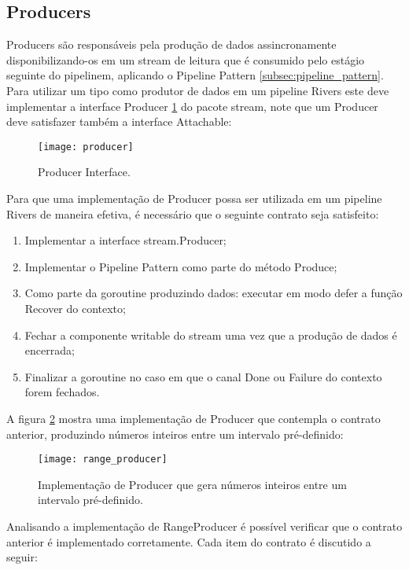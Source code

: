 \subsection{Producers}
\label{sec:rivers:producers}

Producers são responsáveis pela produção de dados assincronamente disponibilizando-os em um stream de leitura que é consumido pelo estágio seguinte do pipelinem, aplicando o Pipeline Pattern \ref{subsec:pipeline_pattern}. Para utilizar um tipo como produtor de dados em um pipeline Rivers este deve implementar a interface Producer \ref{code:rivers:producer} do pacote stream, note que um Producer deve satisfazer também a interface Attachable:

\begin{figure}[H]
  \texttt{[image: producer]}
  \centering
  \caption{Producer Interface.}
  \label{code:rivers:producer}
\end{figure}

Para que uma implementação de Producer possa ser utilizada em um pipeline Rivers de maneira efetiva, é necessário que o seguinte contrato seja satisfeito:

\begin{enumerate}
  \item Implementar a interface stream.Producer;
  \item Implementar o Pipeline Pattern como parte do método Produce;
  \item Como parte da goroutine produzindo dados: executar em modo defer a função Recover do contexto;
  \item Fechar a componente writable do stream uma vez que a produção de dados é encerrada;
  \item Finalizar a goroutine no caso em que o canal Done ou Failure do contexto forem fechados.
\end{enumerate}

A figura \ref{code:rivers:range_producer} mostra uma implementação de Producer que contempla o contrato anterior, produzindo números inteiros entre um intervalo pré-definido:

\begin{figure}[H]
  \texttt{[image: range\_producer]}
  \centering
  \caption{Implementação de Producer que gera números inteiros entre um intervalo pré-definido.}
  \label{code:rivers:range_producer}
\end{figure}

Analisando a implementação de RangeProducer é possível verificar que o contrato anterior é implementado corretamente. Cada item do contrato é discutido a seguir:

